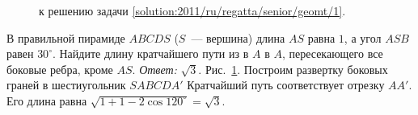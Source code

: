 \ifsolution
\begin{figure}\centering
    \caption{к решению задачи \ref{solution:2011/ru/regatta/senior/geomt/1}.}
    \label{fig:solution:2011/ru/regatta/senior/geomt/1}
\end{figure}%
\fi %

\problem
В правильной пирамиде $ABCDS$ ($S$~--- вершина) длина $AS$ равна $1$, а угол
$ASB$ равен $30^\circ$.
Найдите длину кратчайшего пути из в $A$ в $A$, пересекающего все боковые ребра,
кроме $AS$.
\solution
\label{solution:2011/ru/regatta/senior/geomt/1}%
\emph{Ответ:} $\sqrt{3}$.
Рис.~\ref{fig:solution:2011/ru/regatta/senior/geomt/1}.
Построим развертку боковых граней в шестиугольник $SABCDA'$
Кратчайший путь соответствует отрезку $AA'$.
Его длина равна $\sqrt{1 + 1 - 2 \cos 120^\circ} = \sqrt{3}$.
\endproblem
